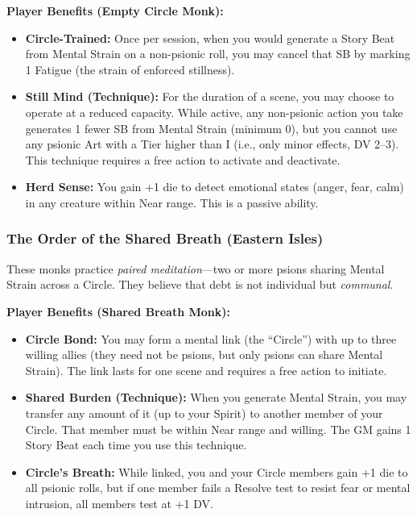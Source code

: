 \documentclass[11pt,twoside]{article}
\begin{document}
\textbf{Player Benefits (Empty Circle Monk):}
\begin{itemize}[leftmargin=*]
    \item \textbf{Circle-Trained:} Once per session, when you would generate a Story Beat from Mental Strain on a non-psionic roll, you may cancel that SB by marking 1 Fatigue (the strain of enforced stillness).
    \item \textbf{Still Mind (Technique):} For the duration of a scene, you may choose to operate at a reduced capacity. While active, any non-psionic action you take generates 1 fewer SB from Mental Strain (minimum 0), but you cannot use any psionic Art with a Tier higher than I (i.e., only minor effects, DV 2--3). This technique requires a free action to activate and deactivate.
    \item \textbf{Herd Sense:} You gain +1 die to detect emotional states (anger, fear, calm) in any creature within Near range. This is a passive ability.
\end{itemize}

\subsubsection{The Order of the Shared Breath (Eastern Isles)}

These monks practice \textit{paired meditation}---two or more psions sharing Mental Strain across a Circle. They believe that debt is not individual but \textit{communal}.

\textbf{Player Benefits (Shared Breath Monk):}
\begin{itemize}[leftmargin=*]
    \item \textbf{Circle Bond:} You may form a mental link (the ``Circle'') with up to three willing allies (they need not be psions, but only psions can share Mental Strain). The link lasts for one scene and requires a free action to initiate.
    \item \textbf{Shared Burden (Technique):} When you generate Mental Strain, you may transfer any amount of it (up to your Spirit) to another member of your Circle. That member must be within Near range and willing. The GM gains 1 Story Beat each time you use this technique.
    \item \textbf{Circle's Breath:} While linked, you and your Circle members gain +1 die to all psionic rolls, but if one member fails a Resolve test to resist fear or mental intrusion, all members test at +1 DV.
\end{itemize}
\end{document}
